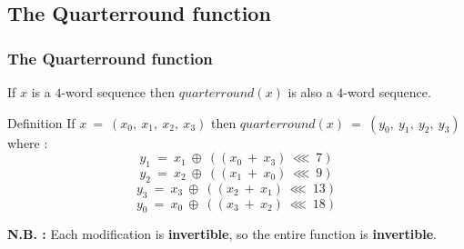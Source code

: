 
\subsection{The Quarterround function}

\begin{frame}
\frametitle{The Quarterround function}

If $x$ is a $4$-word sequence then $quarterround(x)$ is also a $4$-word sequence. 
\begin{block}{Definition}
If $x \ = \ (x_0, \ x_1, \ x_2, \ x_3)$ then ${quarterround(x)} \ = \ (y_0, \ y_1, \ y_2, \ y_3)$ where :
$$y_1 \ = \ x_1 \ \oplus \ ((x_0 \ + \ x_3) \ \lll \ 7)$$
$$y_2 \ = \ x_2 \ \oplus \ ((x_1 \ + \ x_0) \ \lll \ 9)$$ 
$$y_3 \ = \ x_3 \ \oplus \ ((x_2 \ + \ x_1) \ \lll \ 13)$$
$$y_0 \ = \ x_0 \ \oplus \ ((x_3 \ + \ x_2) \ \lll \ 18)$$ 
\end{block}
\textbf{N.B. :} Each modification is \textbf{invertible}, so the entire function is \textbf{invertible}.
\end{frame}